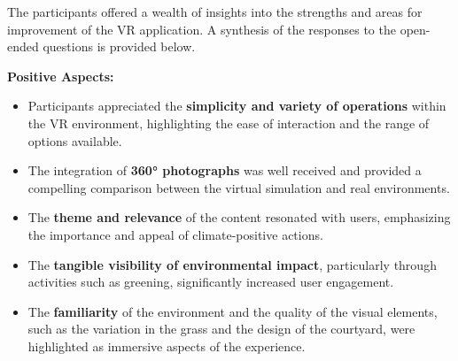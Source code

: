 \documentclass[draft, final]{vutinfth} %
\begin{document}
The participants offered a wealth of insights into the strengths and areas for improvement of the VR application. A synthesis of the responses to the open-ended questions is provided below. 


\textbf{Positive Aspects:}
\begin{itemize}
    \item Participants appreciated the \textbf{simplicity and variety of operations} within the VR environment, highlighting the ease of interaction and the range of options available.
    \item The integration of \textbf{360° photographs} was well received and provided a compelling comparison between the virtual simulation and real environments. %
    \item The \textbf{theme and relevance} of the content resonated with users, emphasizing the importance and appeal of climate-positive actions.
    \item The \textbf{tangible visibility of environmental impact}, particularly through activities such as greening, significantly increased user engagement.
    \item The \textbf{familiarity} of the environment and the quality of the visual elements, such as the variation in the grass and the design of the courtyard, were highlighted as immersive aspects of the experience.
\end{itemize}

\end{document}

